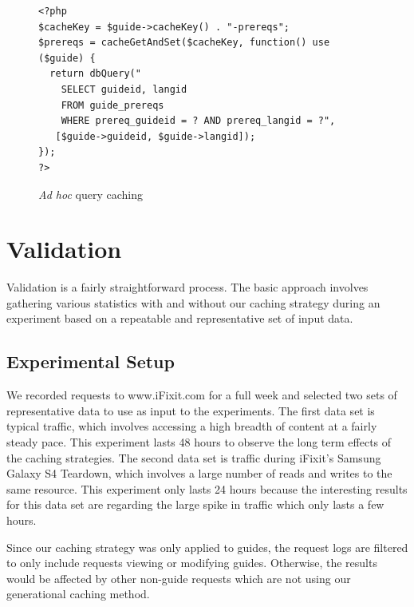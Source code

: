 \documentclass[12pt]{ucthesis}
\begin{document}
\begin{figure}[h]
\begin{ssp}
\begin{verbatim}
<?php
$cacheKey = $guide->cacheKey() . "-prereqs";
$prereqs = cacheGetAndSet($cacheKey, function() use ($guide) {
  return dbQuery("
    SELECT guideid, langid
    FROM guide_prereqs
    WHERE prereq_guideid = ? AND prereq_langid = ?",
   [$guide->guideid, $guide->langid]);
});
?>
\end{verbatim}
\caption{\textit{Ad hoc} query caching}
\label{fig:adHocQueryCaching}
\end{ssp}
\end{figure}


\chapter{Validation} \label{validation}
Validation is a fairly straightforward process.
The basic approach involves gathering various statistics with and without our caching strategy during an experiment based on a repeatable and representative set of input data.

\section{Experimental Setup}
We recorded requests to \textsf{www.iFixit.com} for a full week and selected two sets of representative data to use as input to the experiments.
The first data set is typical traffic, which involves accessing a high breadth of content at a fairly steady pace.
This experiment lasts 48 hours to observe the long term effects of the caching strategies.
The second data set is traffic during \textsf{iFixit}'s Samsung Galaxy S4 Teardown\cite{ifixitGalaxyS4Teardown}, which involves a large number of reads and writes to the same resource.
This experiment only lasts 24 hours because the interesting results for this data set are regarding the large spike in traffic which only lasts a few hours.

Since our caching strategy was only applied to guides, the request logs are filtered to only include requests viewing or modifying guides.
Otherwise, the results would be affected by other non-guide requests which are not using our generational caching method.
\end{document}
